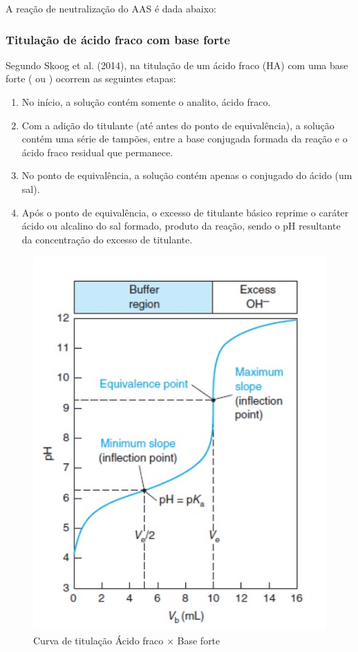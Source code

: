A reação de neutralização do AAS é dada abaixo:

\begin{center}
\end{center} 

\subsubsection{Titulação de ácido fraco com base forte}

Segundo Skoog et al. (2014), na titulação de um ácido fraco (HA) com uma base forte ( ou
) ocorrem as seguintes etapas:

\begin{enumerate}
    \item No início, a solução contém somente o analito, ácido fraco.
    \item Com a adição do titulante (até antes do ponto de equivalência), a solução contém uma série
        de tampões, entre a base conjugada formada da reação e o ácido fraco residual que permanece.
    \item No ponto de equivalência, a solução contém apenas o conjugado do ácido (um sal).
    \item Após o ponto de equivalência, o excesso de titulante básico reprime o caráter ácido ou
        alcalino do sal formado, produto da reação, sendo o pH resultante da concentração do excesso
        de titulante.
\end{enumerate}

\begin{figure}[H]
\begin{center}
    \includegraphics[scale=.9]{figuras/titulacao.jpg}
\end{center}
\caption{Curva de titulação Ácido fraco $\times$ Base forte}
\label{fig:curva_titulacao}
\end{figure}


